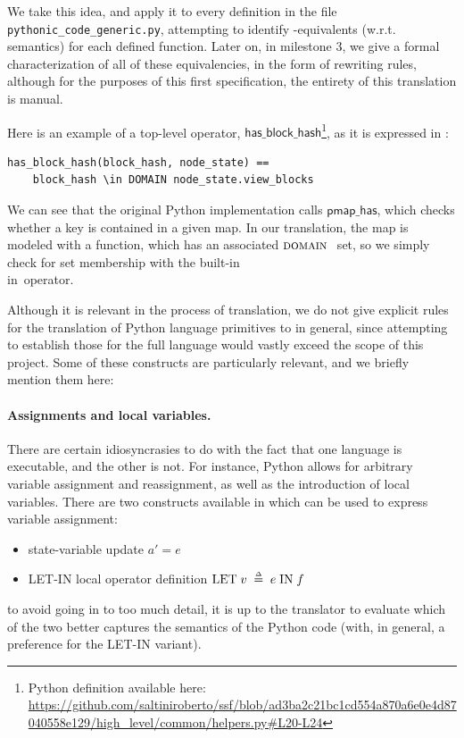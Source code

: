 We take this idea, and apply it to every definition in the file \texttt{pythonic\_code\_generic.py}, attempting to identify \tlap{}-equivalents (w.r.t. semantics) for each defined function. 
Later on, in milestone 3, we give a formal characterization of all of these equivalencies, in the form of rewriting rules, although for the purposes of this first specification, the entirety of this translation is manual.

Here is an example of a top-level operator, $\mathsf{has\_block\_hash}$\footnote{Python definition available here: \url{https://github.com/saltiniroberto/ssf/blob/ad3ba2c21bc1cd554a870a6e0e4d87040558e129/high_level/common/helpers.py\#L20-L24}}, as it is expressed in \tlap{}:
\begin{lstlisting}[language=tla,columns=fullflexible]
has_block_hash(block_hash, node_state) ==
    block_hash \in DOMAIN node_state.view_blocks
\end{lstlisting}
%
We can see that the original Python implementation calls $\mathsf{pmap\_has}$, which checks whether a key is contained in a given map. In our translation, the map is modeled with a \tlap{} function, which has an associated $\textsc{domain }$ set, so we simply check for set membership with the built-in \textsf{\\in}~operator.

Although it is relevant in the process of translation, we do not give explicit rules for the translation of Python language primitives to \tlap{} in general, since attempting to establish those for the full language would vastly exceed the scope of this project. 
Some of these constructs are particularly relevant, and we briefly mention them here:
\paragraph{Assignments and local variables.} There are certain idiosyncrasies to do with the fact that one language is executable, and the other is not. For instance, Python allows for arbitrary variable assignment and reassignment, as well as the introduction of local variables. There are two constructs available in \tlap{} which can be used to express variable assignment:
\begin{itemize}
  \item state-variable update $a' = e$
  \item LET-IN local operator definition $\mathrm{LET}\; v \;\mathrel{\smash {{\stackrel{\scriptscriptstyle\Delta}{=}}}}\; e \;\mathrm{IN}\; f$
\end{itemize}
to avoid going in to too much detail, it is up to the translator to evaluate which of the two better captures the semantics of the Python code (with, in general, a preference for the LET-IN variant).
